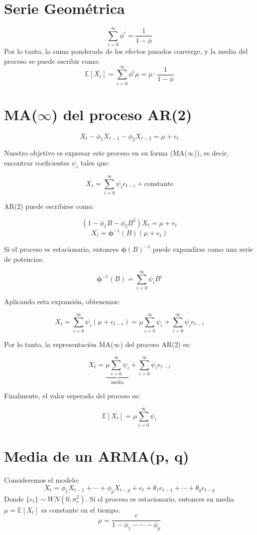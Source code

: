\documentclass[12pt]{article} %
\begin{document}
\begin{multicols}{3}
\section*{Serie Geométrica}
\[
\sum_{i=0}^{\infty} \phi^i = \frac{1}{1 - \phi}
\]
Por lo tanto, la suma ponderada de los efectos pasados converge, y la media del proceso se puede escribir como:
\[
\mathbb{E}[X_t] = \sum_{i=0}^{\infty} \phi^i \mu = \mu \cdot \frac{1}{1 - \phi}
\]


\section*{MA($\infty$) del proceso AR(2)}
\[
X_t - \phi_1 X_{t-1} - \phi_2 X_{t-2} = \mu + e_t
\]

Nuestro objetivo es expresar este proceso en su forma (MA($\infty$)), es decir, encontrar coeficientes \( \psi_i \) tales que:

\[
X_t = \sum_{i=0}^{\infty} \psi_i e_{t-i} + \text{constante}
\]

 AR(2) puede escribirse como:

\[
(1 - \phi_1 B - \phi_2 B^2) X_t = \mu + e_t
\]
\[
X_t = \boldsymbol{\phi}^{-1}(B)(\mu + e_t)
\]

Si el proceso es estacionario, entonces \( \boldsymbol{\phi}(B)^{-1} \) puede expandirse como una serie de potencias:

\[
\boldsymbol{\phi}^{-1}(B) = \sum_{i=0}^{\infty} \psi_i B^i
\]

Aplicando esta expansión, obtenemos:

\[
X_t = \sum_{i=0}^{\infty} \psi_i (\mu + e_{t-i}) = \mu \sum_{i=0}^{\infty} \psi_i + \sum_{i=0}^{\infty} \psi_i e_{t-i}
\]

Por lo tanto, la representación MA($\infty$) del proceso AR(2) es:

\[
X_t = \underbrace{\mu \sum_{i=0}^{\infty} \psi_i}_{\text{media}} + \sum_{i=0}^{\infty} \psi_i e_{t-i}
\]

Finalmente, el valor esperado del proceso es:

\[
\mathbb{E}[X_t] = \mu \sum_{i=0}^{\infty} \psi_i
\]




\section*{Media de un  ARMA(p, q)}
Consideremos el modelo:
\[
X_t = \phi_1 X_{t-1} + \cdots + \phi_p X_{t-p} + e_t + \theta_1 e_{t-1} + \cdots + \theta_q e_{t-q}
\]
Donde \( \{e_t\} \sim WN(0, \sigma_e^2) \). Si el proceso es estacionario, entonces su media \( \mu = \mathbb{E}[X_t] \) es constante en el tiempo.
\[
\mu = \frac{c}{1 - \phi_1 - \cdots - \phi_p}
\]

\end{multicols}
\end{document}
